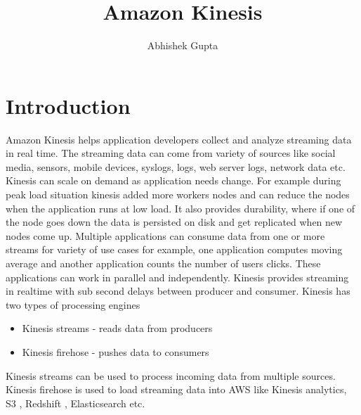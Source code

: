 \documentclass[9pt,twocolumn,twoside]{../../styles/osajnl}
\title{Amazon Kinesis}
\author[1,*]{Abhishek Gupta}
\affil[1]{School of Informatics and Computing, Bloomington, IN 47408, U.S.A.}
\affil[*]{Corresponding authors: abhigupt@iu.edu}
\begin{document}
\maketitle



\section{Introduction}
Amazon Kinesis \cite{www-kinesis} helps application developers collect and
analyze streaming data in real time. The streaming data can come from variety of
sources like social media, sensors, mobile devices, syslogs, logs, web server
logs, network data etc. Kinesis can scale on demand as application needs change.
For example during peak load situation kinesis added more workers nodes and can
reduce the nodes when the application runs at low load. It also provides
durability, where if one of the node goes down the data is persisted on disk and
get replicated when new nodes come up. Multiple applications can consume data
from one or more streams for variety of use cases for example, one application
computes moving average and another application counts the number of users
clicks. These applications can work in parallel and independently. Kinesis
provides streaming in realtime with sub second \SE
{} delays between producer and
consumer. Kinesis has two types of processing engines
\begin{itemize}
	\item Kinesis streams - reads data from producers
	\item Kinesis firehose - pushes data to consumers
\end{itemize}

Kinesis streams can be used to process incoming data from multiple sources.
Kinesis firehose is used to load streaming data into AWS like Kinesis analytics,
S3 \CE, Redshift \CE, Elasticsearch \CE etc.
\end{document}
